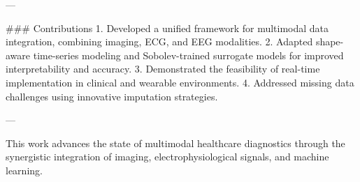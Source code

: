 ---

### Contributions  
1. Developed a unified framework for multimodal data integration, combining imaging, ECG, and EEG modalities.  
2. Adapted shape-aware time-series modeling and Sobolev-trained surrogate models for improved interpretability and accuracy.  
3. Demonstrated the feasibility of real-time implementation in clinical and wearable environments.  
4. Addressed missing data challenges using innovative imputation strategies.  

--- 

This work advances the state of multimodal healthcare diagnostics through the synergistic integration of imaging, electrophysiological signals, and machine learning.